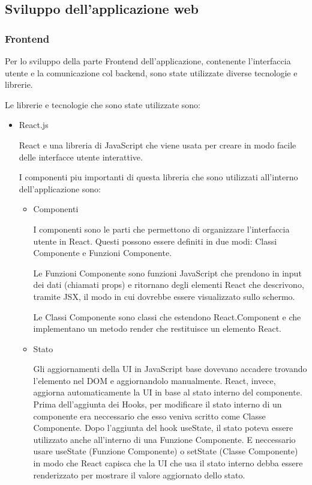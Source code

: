 \documentclass[a4paper,12pt]{report}
\begin{document}
		\subsection{Sviluppo dell'applicazione web}

			\subsubsection{Frontend}
			Per lo sviluppo della parte Frontend dell'applicazione, contenente l'interfaccia utente e la comunicazione col backend, sono state utilizzate diverse tecnologie e librerie. \par
			Le librerie e tecnologie che sono state utilizzate sono:
			\begin{itemize}
				\item React.js \par
				React e una libreria di JavaScript che viene usata per creare in modo facile delle interfacce utente interattive. \par
				I componenti piu importanti di questa libreria che sono utilizzati all'interno dell'applicazione sono:
				\begin{itemize}
				\item Componenti \par
				I componenti sono le parti che permettono di organizzare l’interfaccia utente in React. Questi possono essere definiti in due modi: Classi Componente e Funzioni Componente. \cite{componentireact} \par
				Le Funzioni Componente sono funzioni JavaScript che prendono in input dei dati (chiamati props) e ritornano degli elementi React che descrivono, tramite JSX, il modo in cui dovrebbe essere visualizzato sullo schermo. \cite{tipicomponenti} \par
				Le Classi Componente sono classi che estendono React.Component e che implementano un metodo render che restituisce un elemento React. \par
				\item Stato \par
				Gli aggiornamenti della UI in JavaScript base dovevano accadere trovando l’elemento nel DOM e aggiornandolo manualmente. React, invece, aggiorna automaticamente la UI in base al stato interno del componente. Prima dell’aggiunta dei Hooks, per modificare il stato interno di un componente era neccessario che esso veniva scritto come Classe Componente. Dopo l’aggiunta del hook useState, il stato poteva essere utilizzato anche all’interno di una Funzione Componente. E neccessario usare useState (Funzione Componente) o setState (Classe Componente) in modo che React capisca che la UI che usa il stato interno debba essere renderizzato per mostrare il valore aggiornato dello stato. \cite{statoreact} \par

\end{itemize}
\end{itemize}
\end{document}
